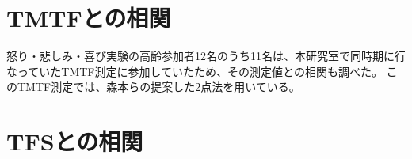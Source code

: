 \section{TMTFとの相関}
怒り・悲しみ・喜び実験の高齢参加者12名のうち11名は、本研究室で同時期に行なっていたTMTF測定に参加していたため、その測定値との相関も調べた。
このTMTF測定では、森本らの提案した2点法を用いている\cite{morimoto2019Two-PointTMTF}。











\section{TFSとの相関}


























